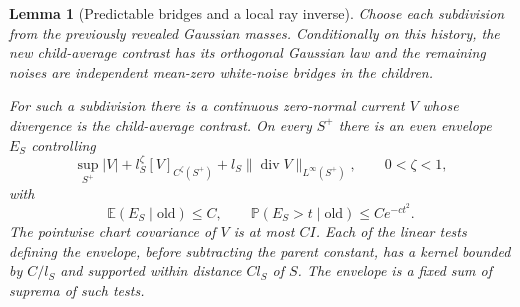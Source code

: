 \documentclass[11pt]{article}
\newtheorem{lemma}[theorem]{Lemma}
\newcommand{\E}{\mathbb E}
\newcommand{\PP}{\mathbb P}
\numberwithin{equation}{section}
\begin{document}
\begin{lemma}[Predictable bridges and a local ray inverse]
\label{lem:local-ray}
Choose each subdivision from the previously revealed Gaussian masses.
Conditionally on this history, the new child-average contrast has its
orthogonal Gaussian law and the remaining noises are independent
mean-zero white-noise bridges in the children.

For such a subdivision there is a continuous zero-normal current $V$
whose divergence is the child-average contrast. On every $S^+$ there is
an even envelope $E_S$ controlling
\[
 \sup_{S^+}|V|+l_S^\zeta[V]_{C^\zeta(S^+)}
             +l_S\|\operatorname{div}V\|_{L^\infty(S^+)},
 \qquad 0<\zeta<1,
\]
with
\[
 \E(E_S\mid\mathrm{old})\le C,\qquad
 \PP(E_S>t\mid\mathrm{old})\le Ce^{-ct^2}.
\]
The pointwise chart covariance of $V$ is at most $CI$. Each of the
linear tests defining the envelope, before subtracting the parent
constant, has a kernel bounded by $C/l_S$ and supported within distance
$Cl_S$ of $S$. The envelope is a fixed sum of suprema of such tests.
\end{lemma}
\end{document}
